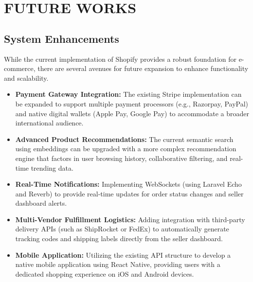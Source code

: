 \chapter{FUTURE WORKS}

\section{System Enhancements}
While the current implementation of Shopify provides a robust foundation for e-commerce, there are several avenues for future expansion to enhance functionality and scalability.

\begin{itemize}
    \item \textbf{Payment Gateway Integration:} The existing Stripe implementation can be expanded to support multiple payment processors (e.g., Razorpay, PayPal) and native digital wallets (Apple Pay, Google Pay) to accommodate a broader international audience.
    \item \textbf{Advanced Product Recommendations:} The current semantic search using embeddings can be upgraded with a more complex recommendation engine that factors in user browsing history, collaborative filtering, and real-time trending data.
    \item \textbf{Real-Time Notifications:} Implementing WebSockets (using Laravel Echo and Reverb) to provide real-time updates for order status changes and seller dashboard alerts.
    \item \textbf{Multi-Vendor Fulfillment Logistics:} Adding integration with third-party delivery APIs (such as ShipRocket or FedEx) to automatically generate tracking codes and shipping labels directly from the seller dashboard.
    \item \textbf{Mobile Application:} Utilizing the existing API structure to develop a native mobile application using React Native, providing users with a dedicated shopping experience on iOS and Android devices.
\end{itemize}
